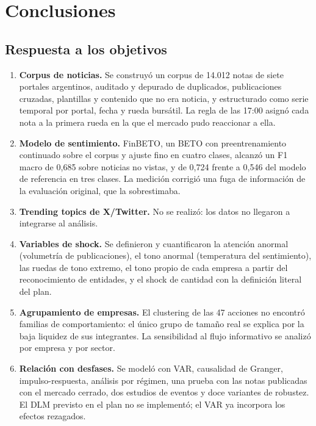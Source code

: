 \chapter{Conclusiones}
\label{cap:conclusiones}

\section{Respuesta a los objetivos}

\begin{enumerate}
  \item \textbf{Corpus de noticias.} Se construyó un corpus de 14.012 notas de siete portales
        argentinos, auditado y depurado de duplicados, publicaciones cruzadas, plantillas y
        contenido que no era noticia, y estructurado como serie temporal por portal, fecha y
        rueda bursátil. La regla de las 17:00 asignó cada nota a la primera rueda en la que el
        mercado pudo reaccionar a ella.
  \item \textbf{Modelo de sentimiento.} FinBETO, un BETO con preentrenamiento continuado sobre el
        corpus y ajuste fino en cuatro clases, alcanzó un F1 macro de 0,685 sobre noticias no
        vistas, y de 0,724 frente a 0,546 del modelo de referencia en tres clases. La medición
        corrigió una fuga de información de la evaluación original, que la sobrestimaba.
  \item \textbf{Trending topics de X/Twitter.} No se realizó: los datos no llegaron a
        integrarse al análisis.
  \item \textbf{Variables de shock.} Se definieron y cuantificaron la atención anormal
        (volumetría de publicaciones), el tono anormal (temperatura del sentimiento), las
        ruedas de tono extremo, el tono propio de cada empresa a partir del reconocimiento de
        entidades, y el shock de cantidad con la definición literal del plan.
  \item \textbf{Agrupamiento de empresas.} El clustering de las 47 acciones no encontró
        familias de comportamiento: el único grupo de tamaño real se explica por la baja
        liquidez de sus integrantes. La sensibilidad al flujo informativo se analizó por
        empresa y por sector.
  \item \textbf{Relación con desfases.} Se modeló con VAR, causalidad de Granger,
        impulso-respuesta, análisis por régimen, una prueba con las notas publicadas con el
        mercado cerrado, dos estudios de eventos y doce variantes de robustez. El DLM previsto
        en el plan no se implementó; el VAR ya incorpora los efectos rezagados.
\end{enumerate}

